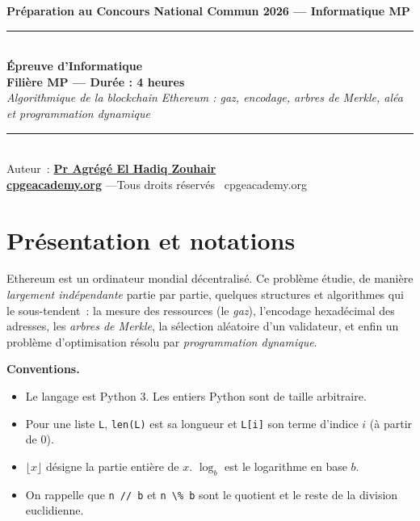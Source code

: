 \documentclass[11pt,a4paper]{article}
\newcommand{\code}[1]{\lstinline!#1!}
\begin{document}
\begin{center}
{\large\bfseries Préparation au Concours National Commun 2026 --- Informatique MP}\\[8pt]
\rule{0.9\linewidth}{0.5pt}\\[6pt]
{\Large\bfseries Épreuve d'Informatique}\\[4pt]
{\bfseries Filière MP --- Durée : 4 heures}\\[6pt]
{\itshape Algorithmique de la blockchain Ethereum : gaz, encodage, arbres de Merkle, aléa et programmation dynamique}\\[6pt]
\rule{0.9\linewidth}{0.5pt}\\[8pt]
{\small Auteur~: \href{https://orcid.org/0000-0002-6108-7176}{\textbf{Pr Agrégé El Hadiq Zouhair}}}\\[3pt]
{\small \href{https://cpgeacademy.org}{\textbf{cpgeacademy.org}} \quad---\quad Tous droits réservés \textcopyright\ cpgeacademy.org}
\end{center}
\medskip
\begin{center}
\end{center}

\bigskip
\section*{Présentation et notations}

Ethereum est un ordinateur mondial décentralisé. Ce problème étudie, de manière \emph{largement
indépendante} partie par partie, quelques structures et algorithmes qui le sous-tendent~: la
mesure des ressources (le \emph{gaz}), l'encodage hexadécimal des adresses, les \emph{arbres de
Merkle}, la sélection aléatoire d'un validateur, et enfin un problème d'optimisation résolu par
\emph{programmation dynamique}.

\noindent\textbf{Conventions.}
\begin{itemize}[nosep]
  \item Le langage est Python 3. Les entiers Python sont de taille arbitraire.
  \item Pour une liste \code{L}, \code{len(L)} est sa longueur et \code{L[i]} son terme d'indice $i$ (à partir de $0$).
  \item $\lfloor x \rfloor$ désigne la partie entière de $x$. $\log_b$ est le logarithme en base $b$.
  \item On rappelle que \code{n // b} et \code{n \% b} sont le quotient et le reste de la division euclidienne.
\end{itemize}
\end{document}
